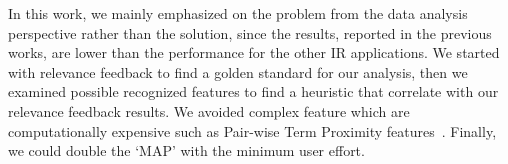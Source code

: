 \documentclass{sig-alternate}
\begin{document}
In this work, we mainly emphasized on the problem from the data analysis perspective rather than the solution, since the results, reported in the previous works, are lower than the performance for the other IR applications. We started with relevance feedback to find a golden standard for our analysis, then we examined possible recognized features to find a heuristic that correlate with our relevance feedback results. We avoided complex feature which are computationally expensive such as Pair-wise Term Proximity features~\cite{bashir2010improving}. Finally, we could double the `MAP' with the minimum user effort. 
\end{document}
